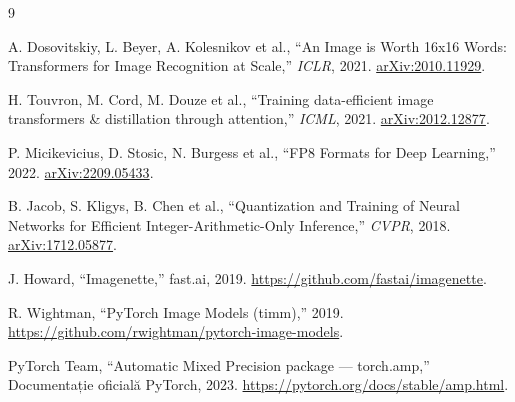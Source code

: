 \documentclass[12pt,a4paper]{article}
\begin{document}
\begin{thebibliography}{9}

A. Dosovitskiy, L. Beyer, A. Kolesnikov et al.,
``An Image is Worth 16x16 Words: Transformers for Image Recognition at Scale,''
\emph{ICLR}, 2021. \href{https://arxiv.org/abs/2010.11929}{arXiv:2010.11929}.

H. Touvron, M. Cord, M. Douze et al.,
``Training data-efficient image transformers \& distillation through attention,''
\emph{ICML}, 2021. \href{https://arxiv.org/abs/2012.12877}{arXiv:2012.12877}.

P. Micikevicius, D. Stosic, N. Burgess et al.,
``FP8 Formats for Deep Learning,''
2022. \href{https://arxiv.org/abs/2209.05433}{arXiv:2209.05433}.

B. Jacob, S. Kligys, B. Chen et al.,
``Quantization and Training of Neural Networks for Efficient Integer-Arithmetic-Only Inference,''
\emph{CVPR}, 2018. \href{https://arxiv.org/abs/1712.05877}{arXiv:1712.05877}.

J. Howard, ``Imagenette,'' fast.ai, 2019.
\url{https://github.com/fastai/imagenette}.

R. Wightman, ``PyTorch Image Models (timm),'' 2019.
\url{https://github.com/rwightman/pytorch-image-models}.

PyTorch Team,
``Automatic Mixed Precision package --- torch.amp,''
Documentație oficială PyTorch, 2023.
\url{https://pytorch.org/docs/stable/amp.html}.

\end{thebibliography}
\end{document}
